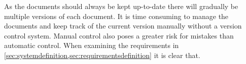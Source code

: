 As the documents should always be kept up-to-date there will gradually be multiple versions of each document.
It is time consuming to manage the documents and keep track of the current version manually without a version control system.
Manual control also poses a greater risk for mistakes than automatic control.
When examining the requirements in \cref{sec:systemdefinition,sec:requirementsdefinition} it is clear that.
